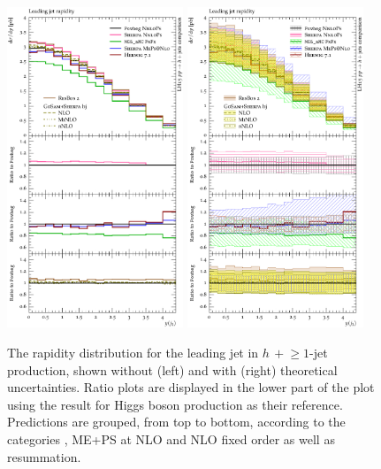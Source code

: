 \begin{figure}[t!]
  \centering
  \includegraphics[width=0.47\textwidth]{figures/hjetscomp_u_jet1_y.pdf}
  \hfill
  \includegraphics[width=0.47\textwidth]{figures/hjetscomp_jet1_y.pdf}
  \caption{\label{fig:hjetscomp:results:1obs:j1y}%
    The rapidity distribution for the leading jet in $h\,+\!\ge\!1$-jet
    production, shown without (left) and with (right) theoretical
    uncertainties. Ratio plots are displayed in the lower part of the
    plot using the \hjetscompPowheg \hjetscompNNLOPS result for Higgs boson production
    as their reference. Predictions are grouped, from top to bottom,
    according to the categories \hjetscompNNLOPS, ME+PS at NLO and NLO fixed
    order as well as resummation.}
\end{figure}

